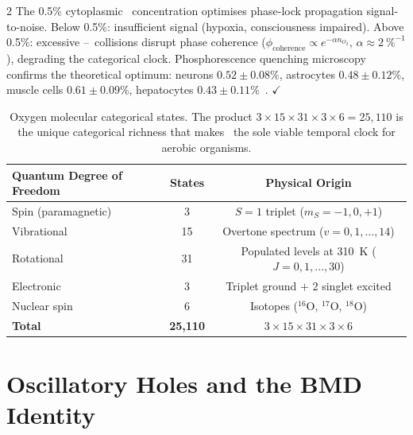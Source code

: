 \begin{multicols}{2}
The 0.5\% cytoplasmic \Otwo\ concentration optimises phase-lock
propagation signal-to-noise.  Below 0.5\%: insufficient signal (hypoxia,
consciousness impaired).  Above 0.5\%: excessive \Otwo--\Otwo\ collisions
disrupt phase coherence ($\phi_{\text{coherence}} \propto e^{-\alpha n_{O_2}}$,
$\alpha\approx2~\%^{-1}$), degrading the categorical clock.  Phosphorescence
quenching microscopy confirms the theoretical optimum: neurons $0.52\pm0.08\%$,
astrocytes $0.48\pm0.12\%$, muscle cells $0.61\pm0.09\%$, hepatocytes
$0.43\pm0.11\%$~\citep{keeley2020oxygen}. $\checkmark$

\end{multicols}

\begin{table}[!ht]
\centering
\caption{Oxygen molecular categorical states.  The product $3\times15\times31\times3\times6 = 25{,}110$ is the unique categorical richness that makes \Otwo\ the sole viable temporal clock for aerobic organisms.}
\label{tab:o2_states}
\small
\begin{tabular}{lcc}
\toprule
\textbf{Quantum Degree of Freedom} & \textbf{States} & \textbf{Physical Origin} \\
\midrule
Spin (paramagnetic)  & 3    & $S=1$ triplet ($m_S = -1, 0, +1$)         \\
Vibrational          & 15   & Overtone spectrum ($v = 0, 1,\ldots, 14$)  \\
Rotational           & 31   & Populated levels at 310~K ($J = 0,1,\ldots,30$) \\
Electronic           & 3    & Triplet ground $+$ 2 singlet excited        \\
Nuclear spin         & 6    & Isotopes ($^{16}$O, $^{17}$O, $^{18}$O)   \\
\midrule
\textbf{Total}       & \textbf{25,110} & $3\times15\times31\times3\times6$ \\
\bottomrule
\end{tabular}
\end{table}

\section{Oscillatory Holes and the BMD Identity}
\label{sec:cc_holes}

